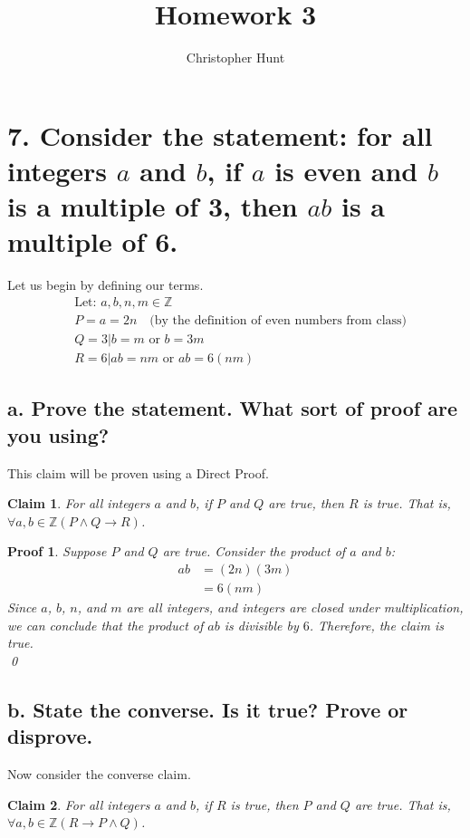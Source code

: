 \documentclass{article}
\title{Homework 3}
\author{Christopher Hunt}
\date{}
\newtheorem*{claim}{Claim}
\newtheorem*{myproof}{Proof}
\begin{document}
\pagestyle{fancy}
\fancyhf{}
\rhead{\thepage}
\maketitle
\section*{7. Consider the statement: for all integers $a$ and $b$, if $a$ is even and $b$ is a multiple of 3, then $ab$ is a multiple of 6.}
Let us begin by defining our terms.
\begin{align*}
    &\text{Let: } a,b,n,m\in\mathbb{Z} \\
    &P = a = 2n \quad \text{(by the definition of even numbers from class)} \\
    &Q = 3|b=m \text{ or } b=3m \\
    &R = 6|ab=nm \text{ or } ab = 6(nm)
\end{align*}
\subsection*{a. Prove the statement. What sort of proof are you using?}
This claim will be proven using a Direct Proof.
\begin{claim}
For all integers $a$ and $b$, if $P$ and $Q$ are true, then $R$ is true. That is, $\forall a, b \in \mathbb{Z} (P \wedge Q \rightarrow R)$.
\end{claim}

\begin{myproof}
Suppose $P$ and $Q$ are true. Consider the product of $a$ and $b$:
\begin{align*}
    ab &= (2n)(3m) \\
       &= 6(nm)
\end{align*}
Since $a$, $b$, $n$, and $m$ are all integers, and integers are closed under multiplication, we can conclude that the product of $ab$ is divisible by $6$. Therefore, the claim is true. \\
\qed
\end{myproof}


\subsection*{b. State the converse. Is it true? Prove or disprove.}
Now consider the converse claim.
\begin{claim}
For all integers $a$ and $b$, if $R$ is true, then $P$ and $Q$ are true. That is, $\forall a, b \in \mathbb{Z} (R \rightarrow P \wedge Q)$.
\end{claim}
\end{document}
